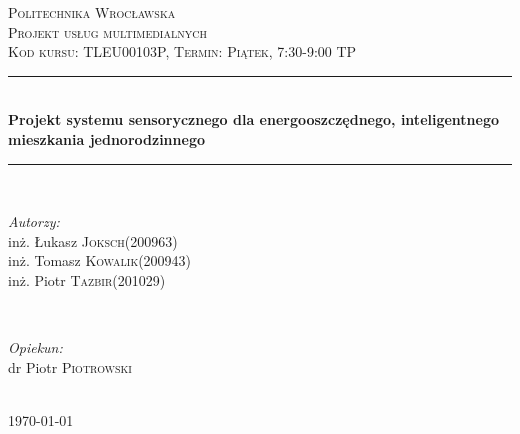 \documentclass[12pt]{article} %
\begin{document}

\begin{titlepage}

\newcommand{\HRule}{\rule{\linewidth}{0.5mm}} %

\center %

\textsc{\LARGE Politechnika Wrocławska}\\[1.5cm] %
\textsc{\Large Projekt usług multimedialnych}\\[0.5cm] %
\textsc{\large Kod kursu: TLEU00103P, Termin: Piątek, 7:30-9:00 TP}\\[0.5cm] %

\HRule \\[0.4cm]
{ \huge \bfseries Projekt systemu sensorycznego dla energooszczędnego, inteligentnego mieszkania jednorodzinnego}\\[0.4cm] %
\HRule \\[1.5cm]

\begin{minipage}{0.4\textwidth}
\begin{flushleft} \large
\emph{Autorzy:}\\
inż. Łukasz \textsc{Joksch}(200963) \\
inż. Tomasz \textsc{Kowalik}(200943) \\
inż. Piotr \textsc{Tazbir}(201029)
\end{flushleft}
\end{minipage}
~
\begin{minipage}{0.4\textwidth}
\begin{flushright} \large
\emph{Opiekun:} \\
dr Piotr \textsc{Piotrowski} %
\end{flushright}
\end{minipage}\\[4cm]

{\large \today}\\[3cm] %


\vfill %

\end{titlepage}
\end{document}
